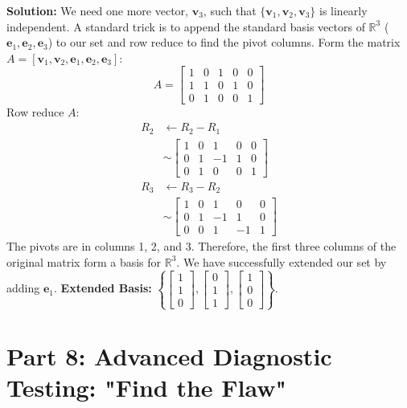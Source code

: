 \documentclass[12pt]{article}
\begin{document}
\textbf{Solution:}
We need one more vector, $\mathbf{v}_3$, such that $\{\mathbf{v}_1, \mathbf{v}_2, \mathbf{v}_3\}$ is linearly independent. A standard trick is to append the standard basis vectors of $\mathbb{R}^3$ ($\mathbf{e}_1, \mathbf{e}_2, \mathbf{e}_3$) to our set and row reduce to find the pivot columns.
Form the matrix $A = [\mathbf{v}_1, \mathbf{v}_2, \mathbf{e}_1, \mathbf{e}_2, \mathbf{e}_3]$:
\[ A = \begin{bmatrix} 1 & 0 & 1 & 0 & 0 \\ 1 & 1 & 0 & 1 & 0 \\ 0 & 1 & 0 & 0 & 1 \end{bmatrix} \]
Row reduce $A$:
\begin{align*}
R_2 &\leftarrow R_2 - R_1 \\
&\sim \begin{bmatrix} 1 & 0 & 1 & 0 & 0 \\ 0 & 1 & -1 & 1 & 0 \\ 0 & 1 & 0 & 0 & 1 \end{bmatrix} \\
R_3 &\leftarrow R_3 - R_2 \\
&\sim \begin{bmatrix} 1 & 0 & 1 & 0 & 0 \\ 0 & 1 & -1 & 1 & 0 \\ 0 & 0 & 1 & -1 & 1 \end{bmatrix}
\end{align*}
The pivots are in columns 1, 2, and 3. 
Therefore, the first three columns of the original matrix form a basis for $\mathbb{R}^3$. We have successfully extended our set by adding $\mathbf{e}_1$.
\textbf{Extended Basis:} $\left\{ \begin{bmatrix} 1 \\ 1 \\ 0 \end{bmatrix}, \begin{bmatrix} 0 \\ 1 \\ 1 \end{bmatrix}, \begin{bmatrix} 1 \\ 0 \\ 0 \end{bmatrix} \right\}$.

\newpage
\section{Part 8: Advanced Diagnostic Testing: "Find the Flaw"}
\end{document}
